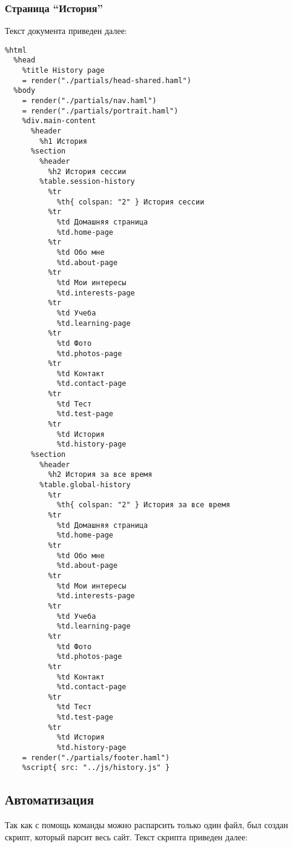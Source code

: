 \documentclass[a4paper,14pt]{extarticle}
\begin{document}
\subsubsection{Страница \enquote{История}}
Текст документа  приведен далее:
\begin{lstlisting}
%html
  %head
    %title History page
    = render("./partials/head-shared.haml")
  %body
    = render("./partials/nav.haml")
    = render("./partials/portrait.haml")
    %div.main-content
      %header
        %h1 История
      %section
        %header
          %h2 История сессии
        %table.session-history
          %tr
            %th{ colspan: "2" } История сессии
          %tr
            %td Домашняя страница
            %td.home-page
          %tr
            %td Обо мне
            %td.about-page
          %tr
            %td Мои интересы
            %td.interests-page
          %tr
            %td Учеба
            %td.learning-page
          %tr
            %td Фото
            %td.photos-page
          %tr
            %td Контакт
            %td.contact-page
          %tr
            %td Тест
            %td.test-page
          %tr
            %td История
            %td.history-page
      %section
        %header
          %h2 История за все время
        %table.global-history
          %tr
            %th{ colspan: "2" } История за все время
          %tr
            %td Домашняя страница
            %td.home-page
          %tr
            %td Обо мне
            %td.about-page
          %tr
            %td Мои интересы
            %td.interests-page
          %tr
            %td Учеба
            %td.learning-page
          %tr
            %td Фото
            %td.photos-page
          %tr
            %td Контакт
            %td.contact-page
          %tr
            %td Тест
            %td.test-page
          %tr
            %td История
            %td.history-page
    = render("./partials/footer.haml")
    %script{ src: "../js/history.js" }
\end{lstlisting}

\subsection{Автоматизация}
Так как с помощь команды можно распарсить только один  файл, был создан  скрипт,
который парсит весь сайт. Текст скрипта приведен далее:
\end{document}
